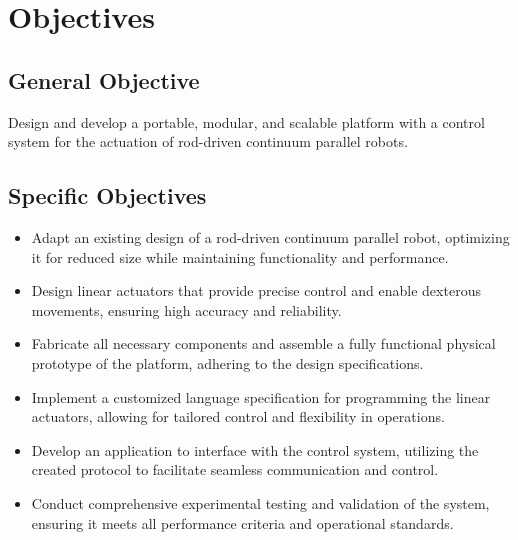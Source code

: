 \section{Objectives}

\subsection{General Objective}
Design and develop a portable, modular, and scalable platform with a control system for the actuation of rod-driven continuum parallel robots.

\subsection{Specific Objectives}
\begin{itemize}
    \item Adapt an existing design of a rod-driven continuum parallel robot, optimizing it for reduced size while maintaining functionality and performance.
    \item Design linear actuators that provide precise control and enable dexterous movements, ensuring high accuracy and reliability.
    \item Fabricate all necessary components and assemble a fully functional physical prototype of the platform, adhering to the design specifications.
    \item Implement a customized language specification for programming the linear actuators, allowing for tailored control and flexibility in operations.
    \item Develop an application to interface with the control system, utilizing the created protocol to facilitate seamless communication and control.
    \item Conduct comprehensive experimental testing and validation of the system, ensuring it meets all performance criteria and operational standards.
\end{itemize}